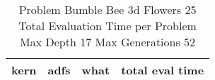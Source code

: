 \begin{table}[H]
\caption{Problem  Bumble Bee 3d  Flowers 25\\Total Evaluation Time per Problem \\ Max Depth 17 Max Generations 52\\}
\begin{center}
\scalebox{1.0} %
{
\begin{tabular}{lllr}
\hline
kern & adfs & what & total eval time \\
\hline


\end{tabular}
}
\end{center}
\end{table}

